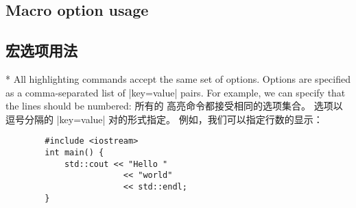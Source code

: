 \begin{paracol}{2}
\subsection{Macro option usage}
\switchcolumn
\subsection{宏选项用法}
\switchcolumn[0]*%
All  highlighting commands accept the same set of options.
Options are specified as a comma-separated list of |key=value| pairs.
For example, we can specify that the lines should be numbered:
\switchcolumn
所有的  高亮命令都接受相同的选项集合。
选项以逗号分隔的 |key=value| 对的形式指定。
例如，我们可以指定行数的显示：
\end{paracol}

\begin{example}
        \begin{verbatim}
        #include <iostream>
        int main() {
            std::cout << "Hello "
                        << "world"
                        << std::endl;
        }
        \end{verbatim}
\end{example}

